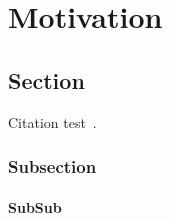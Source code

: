 
\chapter{Motivation}\label{chapter:motivation}

\section{Section}
Citation test~\parencite{latex}.
\cite{latex}


\subsection{Subsection}
\subsubsection{SubSub}



